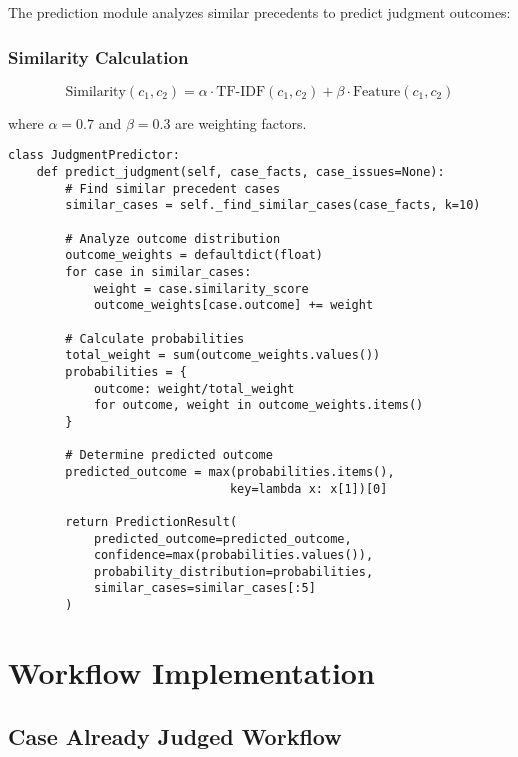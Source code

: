 \documentclass[12pt,a4paper]{article}
\begin{document}
The prediction module analyzes similar precedents to predict judgment outcomes:

\subsubsection{Similarity Calculation}

\begin{equation}
    \text{Similarity}(c_1, c_2) = \alpha \cdot \text{TF-IDF}(c_1, c_2) + \beta \cdot \text{Feature}(c_1, c_2)
\end{equation}

where $\alpha = 0.7$ and $\beta = 0.3$ are weighting factors.

\begin{lstlisting}[caption={Judgment Prediction Algorithm}]
class JudgmentPredictor:
    def predict_judgment(self, case_facts, case_issues=None):
        # Find similar precedent cases
        similar_cases = self._find_similar_cases(case_facts, k=10)
        
        # Analyze outcome distribution
        outcome_weights = defaultdict(float)
        for case in similar_cases:
            weight = case.similarity_score
            outcome_weights[case.outcome] += weight
        
        # Calculate probabilities
        total_weight = sum(outcome_weights.values())
        probabilities = {
            outcome: weight/total_weight 
            for outcome, weight in outcome_weights.items()
        }
        
        # Determine predicted outcome
        predicted_outcome = max(probabilities.items(), 
                               key=lambda x: x[1])[0]
        
        return PredictionResult(
            predicted_outcome=predicted_outcome,
            confidence=max(probabilities.values()),
            probability_distribution=probabilities,
            similar_cases=similar_cases[:5]
        )
\end{lstlisting}

\section{Workflow Implementation}

\subsection{Case Already Judged Workflow}
\end{document}
